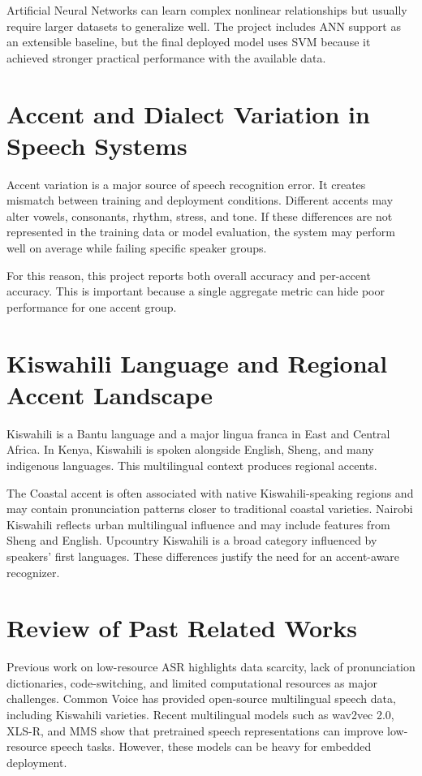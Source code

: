 \documentclass[12pt,a4paper]{report}
\begin{document}
Artificial Neural Networks can learn complex nonlinear relationships but usually require larger datasets to generalize well. The project includes ANN support as an extensible baseline, but the final deployed model uses SVM because it achieved stronger practical performance with the available data.

\section{Accent and Dialect Variation in Speech Systems}
Accent variation is a major source of speech recognition error. It creates mismatch between training and deployment conditions. Different accents may alter vowels, consonants, rhythm, stress, and tone. If these differences are not represented in the training data or model evaluation, the system may perform well on average while failing specific speaker groups.

For this reason, this project reports both overall accuracy and per-accent accuracy. This is important because a single aggregate metric can hide poor performance for one accent group.

\section{Kiswahili Language and Regional Accent Landscape}
Kiswahili is a Bantu language and a major lingua franca in East and Central Africa. In Kenya, Kiswahili is spoken alongside English, Sheng, and many indigenous languages. This multilingual context produces regional accents.

The Coastal accent is often associated with native Kiswahili-speaking regions and may contain pronunciation patterns closer to traditional coastal varieties. Nairobi Kiswahili reflects urban multilingual influence and may include features from Sheng and English. Upcountry Kiswahili is a broad category influenced by speakers' first languages. These differences justify the need for an accent-aware recognizer.

\section{Review of Past Related Works}
Previous work on low-resource ASR highlights data scarcity, lack of pronunciation dictionaries, code-switching, and limited computational resources as major challenges. Common Voice has provided open-source multilingual speech data, including Kiswahili varieties. Recent multilingual models such as wav2vec 2.0, XLS-R, and MMS show that pretrained speech representations can improve low-resource speech tasks. However, these models can be heavy for embedded deployment.
\end{document}
